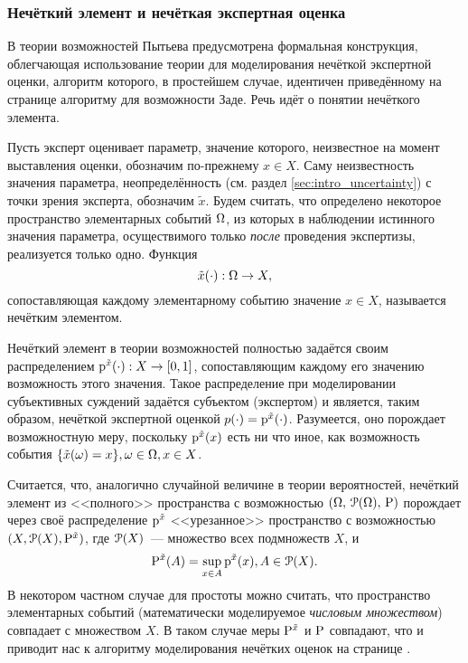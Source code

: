\subsubsection{Нечёткий элемент и нечёткая экспертная оценка}

В теории возможностей Пытьева предусмотрена формальная конструкция, облегчающая использование теории для моделирования нечёткой экспертной оценки, алгоритм которого, в простейшем случае, идентичен приведённому на странице \pageref{zadeh_fuzzy_asset_alg} алгоритму для возможности Заде. Речь идёт о понятии нечёткого элемента.

Пусть эксперт оценивает параметр, значение которого, неизвестное на момент выставления оценки, обозначим по-прежнему $x \in X$. Саму неизвестность значения параметра, неопределённость (см. раздел \ref{sec:intro_uncertainty}) с точки зрения эксперта, обозначим $\tilde x$. Будем считать, что определено некоторое пространство элементарных событий $\Om$, из которых в наблюдении истинного значения параметра, осуществимого только \emph{после} проведения экспертизы, реализуется только одно. Функция
\begin{equation*}
	\tilde x(\cdot): \Om \rightarrow X,
\end{equation*} 
сопоставляющая каждому элементарному событию значение $x \in X$, называется нечётким элементом. 

Нечёткий элемент в теории возможностей полностью задаётся своим распределением $\p^{\tilde x}(\cdot): X \rightarrow \zo$, сопоставляющим каждому его значению возможность этого значения. Такое распределение при моделировании субъективных суждений задаётся субъектом (экспертом) и является, таким образом, нечёткой экспертной оценкой $p(\cdot) = \p^{\tilde x}(\cdot)$. Разумеется, оно порождает возможностную меру, поскольку $\p^{\tilde x}(x)$ есть ни что иное, как возможность события $\{\tilde x(\om) = x\}, \om \in \Om, x \in X$.

Считается, что, аналогично случайной величине в теории вероятностей, нечёткий элемент из <<полного>> пространства с возможностью $\OAP$ порождает через своё распределение $\p^{\tilde x}$ <<урезанное>> пространство с возможностью $(X, \Po(X), \P^{\tilde x})$, где $\Po(X)$~--- множество всех подмножеств $X$, и
\begin{equation*}
	\P^{\tilde x}(A) = \sup_{x \in A} \p^{\tilde x}(x), A \in \Po(X).
\end{equation*} 
В некотором частном случае для простоты можно считать, что пространство элементарных событий (математически моделируемое \emph{числовым множеством}) совпадает с множеством $X$. В таком случае меры $\P^{\tilde x}$ и $\P$ совпадают, что и приводит нас к алгоритму моделирования нечётких оценок на странице \pageref{zadeh_fuzzy_asset_alg}.

